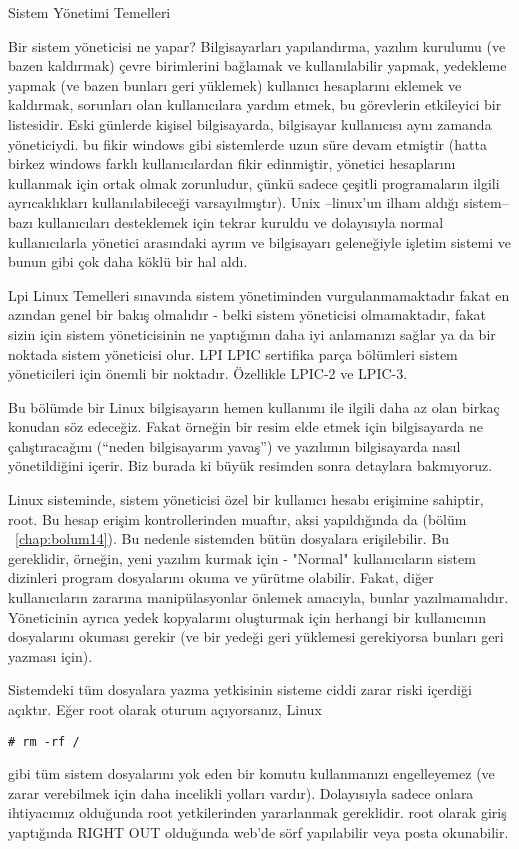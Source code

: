 \begin{section}{Sistem Yönetimi Temelleri}

Bir sistem yöneticisi ne yapar? Bilgisayarları yapılandırma, yazılım kurulumu (ve bazen kaldırmak) çevre birimlerini bağlamak ve kullanılabilir yapmak, yedekleme yapmak (ve bazen bunları geri yüklemek) kullanıcı hesaplarını eklemek ve kaldırmak, sorunları olan kullanıcılara yardım etmek, bu görevlerin etkileyici bir listesidir. Eski günlerde kişisel bilgisayarda, bilgisayar kullanıcısı aynı zamanda yöneticiydi. bu fikir windows gibi sistemlerde uzun süre devam etmiştir (hatta birkez windows farklı kullanıcılardan fikir edinmiştir, yönetici hesaplarını kullanmak için ortak olmak zorunludur, çünkü sadece çeşitli programaların ilgili ayrıcaklıkları kullanılabileceği varsayılmıştır). Unix --linux'un ilham aldığı sistem-- bazı kullanıcıları desteklemek için tekrar kuruldu ve dolayısıyla normal kullanıcılarla yönetici arasındaki ayrım ve bilgisayarı geleneğiyle işletim sistemi ve bunun gibi çok daha köklü bir hal aldı.

Lpi Linux Temelleri sınavında sistem yönetiminden vurgulanmamaktadır fakat en azından genel bir bakış olmalıdır - belki sistem yöneticisi olmamaktadır, fakat sizin için sistem yöneticisinin ne yaptığının daha iyi anlamanızı sağlar ya da bir noktada sistem yöneticisi olur. LPI LPIC sertifika parça bölümleri sistem yöneticileri için önemli bir noktadır. Özellikle LPIC-2 ve LPIC-3. 

Bu bölümde bir Linux bilgisayarın hemen kullanımı ile ilgili daha az olan birkaç konudan söz edeceğiz. Fakat  örneğin bir resim  elde etmek için bilgisayarda ne çalıştıracağını (“neden  bilgisayarım yavaş”)  ve yazılımın bilgisayarda nasıl yönetildiğini içerir. Biz burada ki büyük resimden sonra detaylara bakmıyoruz.  

Linux sisteminde, sistem yöneticisi özel bir kullanıcı hesabı erişimine sahiptir, root. Bu hesap erişim kontrollerinden muaftır, aksi yapıldığında da (bölüm ~\ref{chap:bolum14}). Bu nedenle sistemden  bütün dosyalara erişilebilir. Bu gereklidir, örneğin, yeni yazılım kurmak için - "Normal" kullanıcıların sistem dizinleri program dosyalarını okuma ve yürütme olabilir. Fakat, diğer kullanıcıların zararına manipülasyonlar önlemek amacıyla, bunlar yazılmamalıdır. Yöneticinin ayrıca yedek kopyalarını oluşturmak için herhangi bir kullanıcının dosyalarını okuması gerekir (ve bir yedeği geri yüklemesi gerekiyorsa bunları geri yazması için).

Sistemdeki tüm dosyalara yazma yetkisinin sisteme ciddi zarar riski içerdiği açıktır. Eğer root olarak oturum açıyorsanız, Linux
\begin{verbatim}
# rm -rf /
\end{verbatim}
gibi  tüm sistem dosyalarını yok eden bir komutu kullanmanızı engelleyemez (ve zarar verebilmek için daha incelikli yolları vardır). Dolayısıyla sadece onlara ihtiyacımız olduğunda root yetkilerinden yararlanmak gereklidir. root  olarak giriş yaptığında  RIGHT OUT olduğunda web'de sörf  yapılabilir veya posta okunabilir.


\end{section}
